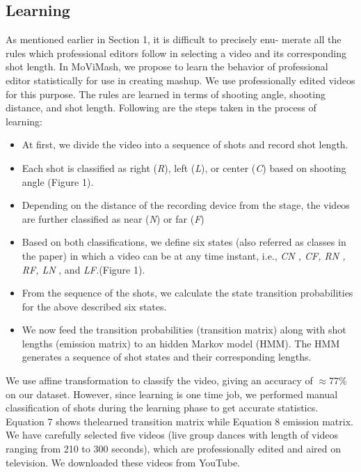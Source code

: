 \documentclass{sig-alternate}
\begin{document}
\subsection{Learning}
As mentioned earlier in Section 1, it is difficult to precisely enu-
merate all the rules which professional editors follow in selecting a video and its corresponding shot length. In MoViMash, we propose to learn the behavior of professional editor statistically for use in creating mashup. We use professionally edited videos for this purpose. The rules are learned in terms of shooting angle, shooting distance, and shot length. Following are the steps taken in the process of learning:

\begin{itemize}
    \item At first, we divide the video into a sequence of shots and record shot length.
    \item Each shot is classified as right (\textit{R}), left (\textit{L}), or center (\textit{C}) based on shooting angle (Figure 1).
    \item Depending on the distance of the recording device from the stage, the videos are further classified as near (\textit{N}) or far (\textit{F})
    \item Based on both classifications, we define six states (also referred as classes in the paper) in which a video can be at any time instant, i.e., \textit{CN , CF, RN , RF, LN} , and\textit{ LF.}(Figure 1).
    \item From the sequence of the shots, we calculate the state transition probabilities for the above described six states.
    \item We now feed the transition probabilities (transition matrix) along with shot lengths (emission matrix) to an hidden Markov model (HMM). The HMM generates a sequence of shot states and their corresponding lengths.

    
    
\end{itemize}

We use affine transformation to classify the video, giving an accuracy of  $ \approx 77\% $ on our dataset. However, since learning is one time job, we performed manual classification of shots during the learning phase to get accurate statistics. Equation 7 shows thelearned transition matrix while Equation 8 emission matrix. We have carefully selected five videos (live group dances with length of videos ranging from 210 to 300 seconds), which are professionally edited and aired on television. We downloaded these videos from YouTube.
\end{document}
